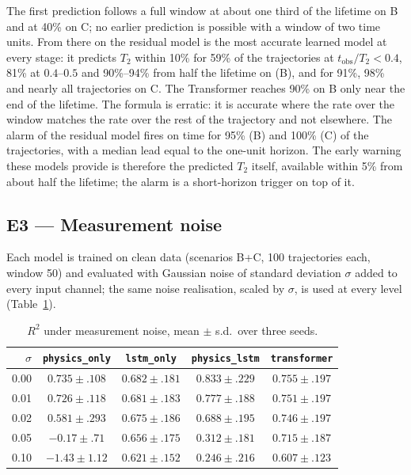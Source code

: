 \documentclass[twocolumn,10pt]{article}
\begin{document}
The first prediction follows a full window at about one third of the lifetime on B and at
40\% on C; no earlier prediction is possible with a window of two time
units. From there on the residual model is the most accurate learned
model at every stage: it predicts $T_2$ within 10\% for 59\% of the
trajectories at $t_\mathrm{obs}/T_2 < 0.4$, 81\% at $0.4$--$0.5$ and
90\%--94\% from half the lifetime on (B), and for 91\%, 98\% and nearly
all trajectories on C. The Transformer reaches 90\% on B only near the end
of the lifetime. The formula is erratic: it is accurate where the rate
over the window matches the rate over the rest of the trajectory and not
elsewhere. The alarm of the residual model fires on time for 95\% (B) and
100\% (C) of the trajectories, with a median lead equal to the one-unit
horizon. The early warning these models provide is therefore the
predicted $T_2$ itself, available within 5\% from about half the
lifetime; the alarm is a short-horizon trigger on top of it.

\subsection{E3 --- Measurement noise}
\label{sec:e3}

Each model is trained on clean data (scenarios B+C, 100 trajectories each,
window 50) and evaluated with Gaussian noise of standard deviation
$\sigma$ added to every input channel; the same noise realisation, scaled
by $\sigma$, is used at every level (Table~\ref{tab:e3}).

\begin{table}[h]
\centering
\caption{$R^2$ under measurement noise, mean $\pm$ s.d.\ over three
  seeds.\label{tab:e3}}
\footnotesize
\setlength{\tabcolsep}{2pt}
\begin{tabular}{rcccc}
\toprule
$\sigma$ & \texttt{physics\_only} & \texttt{lstm\_only} & \texttt{physics\_lstm} & \texttt{transformer} \\
\midrule
0.00 & $0.735 \pm .108$ & $0.682 \pm .181$ & $\mathbf{0.833 \pm .229}$ & $0.755 \pm .197$ \\
0.01 & $0.726 \pm .118$ & $0.681 \pm .183$ & $\mathbf{0.777 \pm .188}$ & $0.751 \pm .197$ \\
0.02 & $0.581 \pm .293$ & $0.675 \pm .186$ & $0.688 \pm .195$ & $\mathbf{0.746 \pm .197}$ \\
0.05 & $-0.17 \pm .71$  & $0.656 \pm .175$ & $0.312 \pm .181$ & $\mathbf{0.715 \pm .187}$ \\
0.10 & $-1.43 \pm 1.12$ & $\mathbf{0.621 \pm .152}$ & $0.246 \pm .216$ & $0.607 \pm .123$ \\
\bottomrule
\end{tabular}
\end{table}
\end{document}
